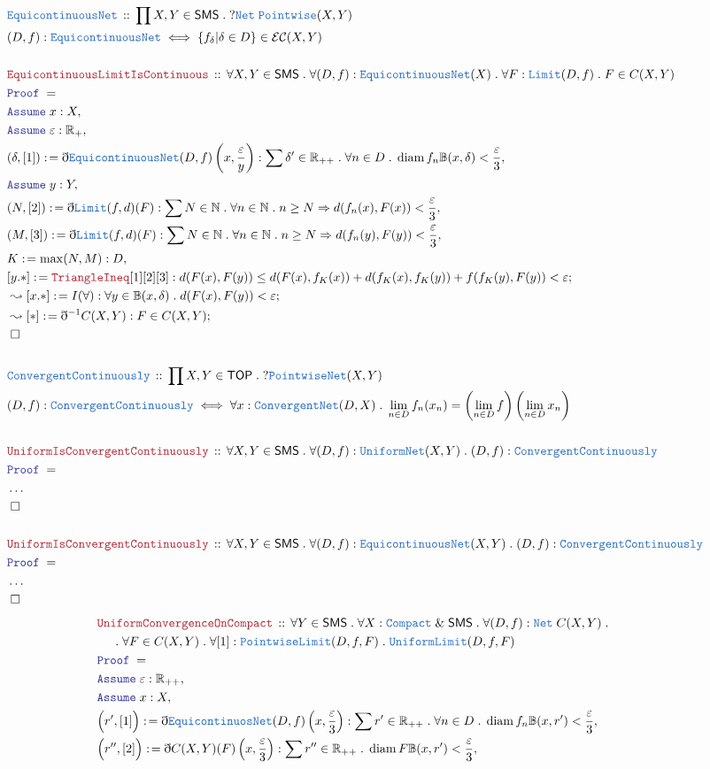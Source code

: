\documentclass[12pt]{scrartcl}
\newcommand{\TYPE}[1]{\textcolor{NavyBlue}{\mathtt{#1}}}
\newcommand{\LOGIC}[1]{\textcolor{Blue}{\mathtt{#1}}}
\newcommand{\THM}[1]{\textcolor{Maroon}{\mathtt{#1}}}
\renewcommand{\.}{\; . \;}
\newcommand{\de}{: \kern 0.1pc =}
\newcommand{\Act}[1]{\left( #1 \right)}
\newcommand{\Theorem}[2]{& \THM{#1} \, :: \, #2 \\ & \Proof = \\ }
\newcommand{\DeclareType}[2]{& \TYPE{#1} \, :: \, #2 \\}
\newcommand{\DefineType}[3]{& #1 : \TYPE{#2} \iff #3 \\}
\newcommand{\NewLine}{\\ & \kern 1pc}
\newcommand{\Page}[1]{ \begin{align*} #1 \end{align*}   }
\newcommand{ \bd }{ \ByDef }
\newcommand{\NoProof}{ & \ldots \\ \EndProof}
\renewcommand{\And}{\; \& \;}
\newcommand{\Imply}{\Rightarrow}
\newcommand{\Reals}{\mathbb{R} }
\newcommand{\Nat}{\mathbb{N} }
\newcommand{\Say}[3]{& #1 \de #2 : #3, \\}
\newcommand{\Conclude}[3]{& #1 \de #2 : #3; \\}
\newcommand{\DeriveConclude}[3]{& \leadsto #1 \de #2 : #3 ; \\}
\newcommand{\Assume}[2]{& \LOGIC{Assume} \; #1 : #2, \\}
\newcommand{\QED}{\; \square}
\newcommand{\EndProof}{& \QED \\}
\newcommand{\ByDef}{\eth}
\newcommand{\Proof}{\LOGIC{Proof} \; }
\newcommand{\TOP}{\mathsf{TOP}}
\DeclareMathOperator{\diam}{diam}
\newcommand{\SMS}{\mathsf{SMS}}
\begin{document}
\Page{
	\DeclareType{EquicontinuousNet}{\prod X ,Y \in \SMS \. ?\TYPE{Net}\;\TYPE{Pointwise}(X,Y)}
	\DefineType{(D,f)}{EquicontinuousNet}{   \{  f_\delta | \delta \in D \} \in \mathcal{EC}(X,Y)}
	\\
	\Theorem{EquicontinuousLimitIsContinuous}{\forall X,Y \in \SMS \. \forall (D,f) : \TYPE{EquicontinuousNet}(X) \. \forall F : \TYPE{Limit}(D,f)  \. F \in C(X,Y) }
	\Assume{x}{X}
	\Assume{\varepsilon}{\Reals_+}
	\Say{(\delta,[1])}{\bd \TYPE{EquicontinuousNet}(D,f)\left(x,\frac{\varepsilon}{y}\right)}{ \sum \delta' \in \Reals_{++} \. \forall n \in D \.  \diam f_n \mathbb{B}(x,\delta) < \frac{\varepsilon}{3}}
	\Assume{y}{Y}
	\Say{(N,[2])}{ \bd \TYPE{Limit}(f,d)(F) }{\sum N \in \Nat \. \forall  n  \in \Nat \. n \ge N \Imply   d(f_n(x), F(x)) <  \frac{\varepsilon}{3} }
	\Say{(M,[3])}{ \bd \TYPE{Limit}(f,d)(F) }{\sum N \in \Nat \. \forall  n  \in \Nat \. n \ge N \Imply   d(f_n(y), F(y)) <  \frac{\varepsilon}{3} }
	\Say{K}{\max(N,M)}{D}
	\Conclude{[y.*]}{\THM{TriangleIneq}[1][2][3]}{ d(F(x),F(y))  \le   d(F(x),f_K(x)) + d(f_K(x),f_K(y)) + f(f_K(y),F(y)) < \varepsilon }
	\DeriveConclude{[x.*]}{I(\forall)}{\forall  y \in \mathbb{B}(x,\delta) \.  d(F(x),F(y)) < \varepsilon}
	\DeriveConclude{[*]}{\bd^{-1} C(X,Y)}{F \in C(X,Y)}
	\EndProof
	\\
	\DeclareType{ConvergentContinuously}{\prod X,Y \in \TOP \. ?\TYPE{PointwiseNet}(X,Y)}
	\DefineType{(D,f)}{ConvergentContinuously}{\forall x : \TYPE{ConvergentNet}(D,X) \. \lim_{n \in D} f_n(x_n) = 
		\left(\lim_{n \in D} f\right)\left(\lim_{n \in D} x_n\right)}
	\\
	\Theorem{UniformIsConvergentContinuously}{\forall X,Y \in \SMS \. \forall (D,f) : \TYPE{UniformNet}(X,Y) \. (D,f) : \TYPE{ConvergentContinuously}}
	\NoProof
	\\
	\Theorem{UniformIsConvergentContinuously}{\forall X,Y \in \SMS \. \forall (D,f) : \TYPE{EquicontinuousNet}(X,Y) \. (D,f) : \TYPE{ConvergentContinuously}}
	\NoProof
}\Page{
	\Theorem{UniformConvergenceOnCompact}{
		\forall Y \in \SMS \. 
		\forall X : \TYPE{Compact} \And \SMS \. 
		\forall (D,f) : \TYPE{Net} \; C(X,Y) \.  \NewLine \.
		\forall F \in C(X,Y)  \.
		\forall [1] : \TYPE{PointwiseLimit}(D,f,F) \. 
		\TYPE{UniformLimit}(D,f,F) 
	}
	\Assume{\varepsilon}{\Reals_{++}}
	\Assume{x}{X}
	\Say{\Big(r',[1] \Big)}{\bd \TYPE{EquicontinuosNet}(D,f)\left( x, \frac{\varepsilon}{3} \right)}{\sum r' \in \Reals_{++} \. \forall n \in D \. \diam f_n \mathbb{B}(x,r') < \frac{\varepsilon}{3}  }
	\Say{\Big( r'',[2] \Big)}{ \bd C(X,Y)(F)\Act{x,\frac{\varepsilon}{3}}  }{\sum r'' \in \Reals_{++} \. \diam F\mathbb{B}(x,r') < \frac{\varepsilon}{3} }
}
\end{document}
